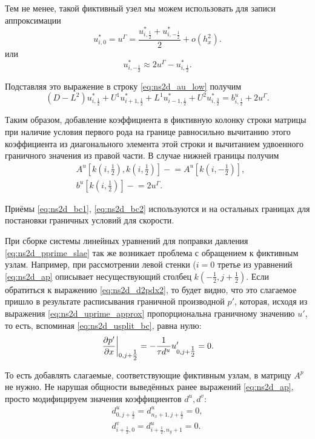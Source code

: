 Тем не менее, такой фиктивный узел мы можем 
использовать для записи аппроксимации
\begin{equation*}
    u^*_{i,0} = u^\Gamma = \frac{u^*_{i,\tfrac12} + u^*_{i, -\tfrac12}}{2} + o(h_x^2).
\end{equation*}
или
\begin{equation*}
    u^*_{i, -\tfrac12} \approx 2u^\Gamma - u^*_{i,\tfrac12}.
\end{equation*}

Подставляя это выражение в строку \eqref{eq:ns2d_au_low} получим
\begin{equation*}
      (D - L^2) u^*_{i, \tfrac12}
    + U^1       u^*_{i+1, \tfrac12}
    + L^1       u^*_{i-1, \tfrac12}
    + U^2       u^*_{i, \tfrac32}
    = b^u_{i, \tfrac12} + 2 u^\Gamma.
\end{equation*}

Таким образом, добавление коэффициента в фиктивную колонку строки матрицы при
наличие условия первого рода на границе равносильно
вычитанию этого коэффициента из диагонального элемента этой строки
и вычитанием удвоенного граничного значения из правой части.
В случае нижней границы получим
\begin{align}
    \label{eq:ns2d_bc2}
    &A^u[k(i, \tfrac12), k(i, \tfrac12)] \mathrel{-}= A^u[k(i, -\tfrac12)], \\[10pt]
    \nonumber
    &b^u[k(i, \tfrac12)] \mathrel{-}= 2 u^\Gamma.
\end{align}

Приёмы \eqref{eq:ns2d_bc1}, \eqref{eq:ns2d_bc2}
используются и на остальных границах для
постановки граничных условий для скорости.

При сборке системы линейных уравнений для
поправки давления \eqref{eq:ns2d_pprime_slae}
так же возникает проблема с обращением
к фиктивным узлам. Например, при рассмотрении левой стенки ($i=0$
третье из уравнений \eqref{eq:ns2d_ap} описывает
несуществующий столбец $k(-\tfrac12, j+\tfrac12)$.
Если обратиться к выражению \eqref{eq:ns2d_d2pdx2},
то будет видно, что это слагаемое пришло в результате
расписывания граничной производной $p'$,
которая, исходя из выражения \eqref{eq:ns2d_uprime_approx} пропорциональна граничному значению $u'$,
то есть, вспоминая \eqref{eq:ns2d_usplit_bc}, равна нулю:
\begin{equation*}
\left. \frac{\partial p'}{\partial x} \right|_{0,j+\tfrac12} = -\frac{1}{\tau d^u} u'_{0,j+\tfrac12} = 0.
\end{equation*}

То есть добавлять слагаемые, соответствующие фиктивным узлам, в матрицу $A^p$ не нужно.
Не нарушая общности выведённых ранее выражений \eqref{eq:ns2d_ap},
просто модифицируем значения коэффициентов $d^u, d^v$:
\begin{align}
    \label{eq:ns2d_bc3}
    d^u_{0, j+\tfrac12} = d^u_{n_x+1, j+\tfrac12} = 0, \\[10pt]
    \nonumber
    d^v_{i+\tfrac12, 0} = d^u_{i+\tfrac12, n_y+1} = 0.
\end{align}


